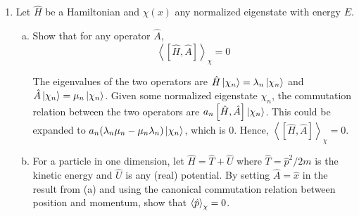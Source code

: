 \documentclass[10pt,letterpaper]{article}
\begin{document}
\begin{enumerate}
\begin{enumerate}[(a)]
\item A measurement of $Q$ is made at time zero, and the result $+1$ is obtained. The system is then left undisturbed for a time $t$, at which instant another measurement of $Q$ is made. What is the probability that the result will again be $+1$? Show that the probability is zero if the measurement is made when a time $T = \pi\hbar/(E_{2} - E_{1})$ has elapsed (assume $E_{2} - E_{1} > 0$). 

\color{violet}
The probability that the result is $+1$ again is $\frac{1}{2}$, as given by $\braket{H}$. Ignoring the position of the wavefunction, $\chi(0) = \chi_{+} = \frac{\chi_{1} + \chi_{2}}{\sqrt{2}}$. Given that the time evolution operator $U(t) = e^{i\hat{H}t/\hbar}$, that means $\chi(t) = e^{i\hat{H}t/\hbar}\frac{\chi_{1} + \chi_{2}}{\sqrt{2}} = (e^{\frac{i\hat{H}t}{\hbar}}\chi_{1} + e^{\frac{i\hat{H}t}{\hbar}}\chi_{2})/\sqrt{2}$. The probability will be found from the squared inner product $\braket{\chi_{1} | \chi(t)}$, resulting in $\frac{1 + \cos((E_{2} - E_{1}t)/\hbar)}{2}$. When evaluated for $T = \pi\hbar/(E_{2} - E_{1})$, the result will be $0$. 
\color{black}

\end{enumerate}

\item Let $\hat{H}$ be a Hamiltonian and $\chi(x)$ any normalized eigenstate with energy $E$.

\begin{enumerate}[(a)]
\item Show that for any operator $\hat{A}$,
$$\left\langle \left[ \hat{H}, \hat{A} \right] \right\rangle_{\chi} = 0$$

\color{violet}
The eigenvalues of the two operators are $\hat{H}\ket{\chi_{n}} = \lambda_{n}\ket{\chi_{n}}$ and $\hat{A}\ket{\chi_{n}} = \mu_{n}\ket{\chi_{n}}$. Given some normalized eigenstate $\chi_{n}$, the commutation relation between the two operators are $a_{n} \left[\hat{H}, \hat{A}\right]\ket{\chi_{n}}$. This could be expanded to $a_{n} (\lambda_{n}\mu_{n} - \mu_{n}\lambda_{n})\ket{\chi_{n}}$, which is 0. Hence, $\left\langle \left[ \hat{H}, \hat{A} \right] \right\rangle_{\chi} = 0$. 
\color{black}

\item For a particle in one dimension, let $\hat{H} = \hat{T} + \hat{U}$ where $\hat{T} = \hat{p}^{2}/2m$ is the kinetic energy and $\hat{U}$ is any (real) potential. By setting $\hat{A} = \hat{x}$ in the result from (a) and using the canonical commutation relation between position and momentum, show that $\braket{\hat{p}}_{\chi} = 0$.  


\end{enumerate}
\end{enumerate}
\end{document}

